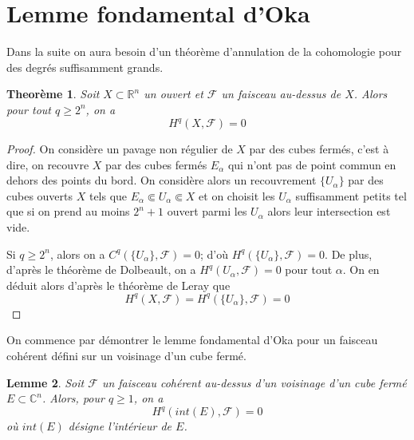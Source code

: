 \documentclass{article}
\newtheorem{theoreme}{Theorème}[section]
\newtheorem{lemme}[theoreme]{Lemme}
\theoremstyle{definition}
\theoremstyle{remark}
\begin{document}
\section{Lemme fondamental d'Oka}

Dans la suite on aura besoin d'un théorème d'annulation de la cohomologie pour des degrés suffisamment grands.
\begin{theoreme}
Soit $X \subset \mathbb{R}^n$ un ouvert et $\mathcal{F}$ un faisceau au-dessus de $X$. Alors pour tout $q \geq 2^n$, on a $$H^q(X, \mathcal{F})=0$$
\end{theoreme}

\begin{proof}
On considère un pavage non régulier de $X$ par des cubes fermés, c'est à dire, on recouvre $X$ par des cubes fermés $E_\alpha$ qui n'ont pas de point commun en dehors des points du bord. On considère alors un recouvrement $\{U_\alpha\}$ par des cubes ouverts $X$ tels que $E_\alpha \Subset U_\alpha \Subset X$ et on choisit les $U_\alpha$ suffisamment petits tel que si on prend au moins $2^n+1$ ouvert parmi les $U_\alpha$ alors leur intersection est vide.

Si $q \geq 2^n$, alors on a $C^q(\{U_\alpha\}, \mathcal{F})=0$; d'où $H^q(\{U_\alpha\}, \mathcal{F})=0$. De plus, d'après le théorème de Dolbeault, on a $H^q(U_\alpha, \mathcal{F})=0$ pour tout $\alpha$. On en déduit alors d'après le théorème de Leray que
$$H^q(X, \mathcal{F})=H^q(\{U_\alpha\}, \mathcal{F})=0$$
\end{proof}

On commence par démontrer le lemme fondamental d'Oka pour un faisceau cohérent défini sur un voisinage d'un cube fermé.
\begin{lemme}
Soit $\mathcal{F}$ un faisceau cohérent au-dessus d'un voisinage d'un cube fermé $E \subset \mathbb{C}^n$. Alors, pour $q \geq 1$, on a
$$H^q(int(E), \mathcal{F})=0$$
où $int(E)$ désigne l'intérieur de $E$.
\end{lemme}
\end{document}
